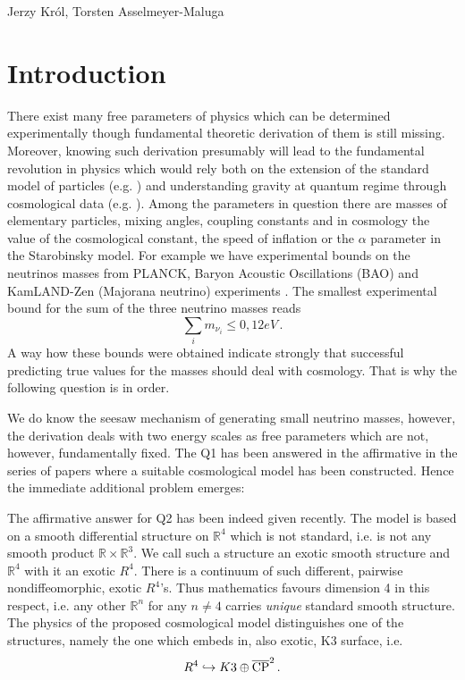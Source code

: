 \begin{artengenv2auth}{Jerzy Kr\'ol, Torsten Asselmeyer-Maluga}
\section{Introduction}
\lettrine[loversize=0.13,lines=2,lraise=-0.03,nindent=0em,findent=0.2pt]%
{T}{}here exist many free parameters of physics which can be determined experimentally though fundamental theoretic derivation of them is still missing. Moreover, knowing such derivation presumably will lead to the fundamental revolution in physics which would rely both on the extension of the standard model of particles (e.g. \cite{Weinberg2018}) and understanding gravity at quantum regime through cosmological data (e.g. \cite{Woodard2014}). Among the parameters in question there are masses of elementary particles, mixing angles, coupling constants and in cosmology the value of the cosmological constant, the speed of inflation or the $\alpha$ parameter in the Starobinsky model. For example we have experimental bounds on the neutrinos masses from PLANCK, Baryon Acoustic Oscillations (BAO) and KamLAND-Zen (Majorana neutrino) experiments \parencite{Neutrino-mass-KmLAND-Zen2016,PlanckCosmoParam2015,Neutrino2015}. The smallest experimental bound for the sum of the three neutrino masses reads
\[ \sum_i m_{\nu_i}\leq 0,12eV\,.\]
A way how these bounds were obtained indicate strongly that successful predicting true values for the masses should deal with cosmology. That is why the following question is in order.


We do know the seesaw mechanism of generating small neutrino masses, however, the derivation deals with two energy scales as free parameters which are not, however, fundamentally fixed. The Q1 has been answered in the affirmative in the series of papers \parencite{AK2018,AK2014,AK2019} where a suitable cosmological model has been constructed. Hence the immediate additional problem emerges:


The affirmative answer for Q2 has been indeed given recently. The model is based on a smooth differential structure on $\mathbb{R}^4$ which is not standard, i.e. is not any smooth product $\mathbb{R}\times\mathbb{R}^3$. We call such a structure an exotic smooth structure and $\mathbb{R}^4$ with it an exotic $R^4$. There is a continuum of such different, pairwise nondiffeomorphic, exotic $R^4$'s. Thus mathematics favours dimension 4 in this respect, i.e. any other $\mathbb{R}^n$ for any $n\neq 4$ carries {\em unique} standard smooth structure. The physics of the proposed cosmological model distinguishes one of the structures, namely the one which embeds in, also exotic, K3 surface, i.e.
\[R^4\hookrightarrow K3\oplus \overline{{\rm CP}}^2\,.  \]


\end{artengenv2auth}
